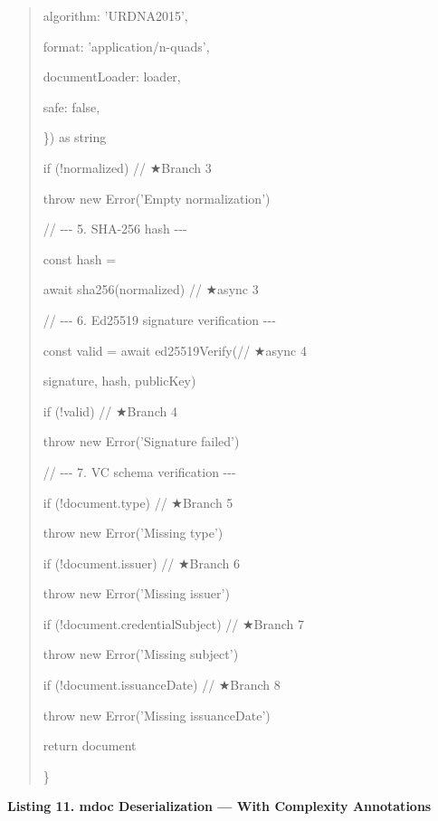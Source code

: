 \begin{quote}
algorithm: 'URDNA2015',

format: 'application/n-quads',

documentLoader: loader,

safe: false,

\}) as string

if (!normalized) // ★Branch 3

throw new Error('Empty normalization')

// -\/-\/- 5. SHA-256 hash -\/-\/-

const hash =

await sha256(normalized) // ★async 3

// -\/-\/- 6. Ed25519 signature verification -\/-\/-

const valid = await ed25519Verify(// ★async 4

signature, hash, publicKey)

if (!valid) // ★Branch 4

throw new Error('Signature failed')

// -\/-\/- 7. VC schema verification -\/-\/-

if (!document.type) // ★Branch 5

throw new Error('Missing type')

if (!document.issuer) // ★Branch 6

throw new Error('Missing issuer')

if (!document.credentialSubject) // ★Branch 7

throw new Error('Missing subject')

if (!document.issuanceDate) // ★Branch 8

throw new Error('Missing issuanceDate')

return document

\}
\end{quote}

\textbf{Listing 11. mdoc Deserialization --- With Complexity Annotations}


